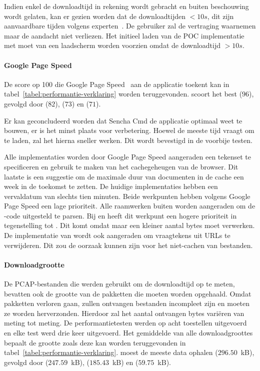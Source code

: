 Indien enkel de downloadtijd in rekening wordt gebracht en \st{} buiten beschouwing wordt gelaten, kan er gezien worden dat de downloadtijden $< 10\unit{s}$,  dit zijn aanvaardbare tijden volgens experten~\cite{Nielsen1993}.
De gebruiker zal de vertraging waarnemen maar de aandacht niet verliezen.
Het initieel laden van de POC implementatie met \st{} moet van een laadscherm worden voorzien omdat de downloadtijd $> 10\unit{s}$.


\paragraph{Google Page Speed}
De score op 100 die Google Page Speed~\cite{Morgan2011} aan de applicatie toekent kan in tabel~\ref{tabel:performantie-verklaring} worden teruggevonden.
\st{} scoort het best ($96$),  gevolgd door \lungo{} ($82$),  \kendo{}($73$) en \jqm{}($71$).

Er kan geconcludeerd worden dat Sencha Cmd de applicatie optimaal weet te bouwen,  er is het minst plaats voor verbetering.
Hoewel \st{} de meeste tijd vraagt om te laden, zal het hierna sneller werken.
Dit wordt bevestigd in de voorbije testen.

Alle implementaties worden door Google Page Speed aangeraden een tekenset te specificeren en gebruik te maken van het cachegeheugen van de browser.
Dit laatste is een suggestie om de maximale duur van documenten in de cache een week in de toekomst te zetten.
De huidige implementaties hebben een vervaldatum van slechts tien minuten.
Beide werkpunten hebben volgens Google Page Speed een lage prioriteit.
Alle raamwerken buiten \st{} worden aangeraden om de \js-code uitgesteld te parsen.
Bij \kendo{} en \jqm{} heeft dit werkpunt een hogere prioriteit in tegenstelling tot \lungo{}.
Dit komt omdat \lungo{} maar een kleiner aantal bytes moet verwerken.
De implementatie van \st{} wordt ook aangeraden om vraagtekens uit URLs te verwijderen.
Dit zou de oorzaak kunnen zijn voor het niet-cachen van bestanden.

\paragraph{Downloadgrootte}
De PCAP-bestanden die werden gebruikt om de downloadtijd op te meten, bevatten ook de grootte van de pakketten die moeten worden opgehaald.
Omdat pakketten verloren gaan, zullen ontvangen bestanden incompleet zijn en moeten ze worden herverzonden.
Hierdoor zal het aantal ontvangen bytes variëren van meting tot meting.
De performantietesten werden op acht toestellen uitgevoerd en elke test werd drie keer uitgevoerd.
Het gemiddelde van alle downloadgroottes bepaalt de grootte zoals deze kan worden teruggevonden in tabel~\ref{tabel:performantie-verklaring}.
\kendo{} moest de meeste data ophalen ($296.50$~kB),  gevolgd door \st{} ($247.59$~kB), \jqm{} ($185.43$~kB) en \lungo{} ($59.75$~kB).